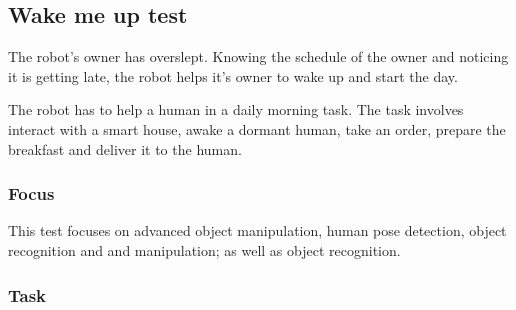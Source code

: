 \subsection{Wake me up test}

The robot's owner has overslept. Knowing the schedule of the owner and noticing it is getting late, the robot helps it's owner to wake up and start the day.

The robot has to help a human in a daily morning task. The task involves interact with a smart house, awake a dormant human, take an order, prepare the breakfast and deliver it to the human.

\subsubsection{Focus}

This test focuses on advanced object manipulation, human pose detection, object recognition and and manipulation; as well as object recognition.


\subsubsection{Task}


